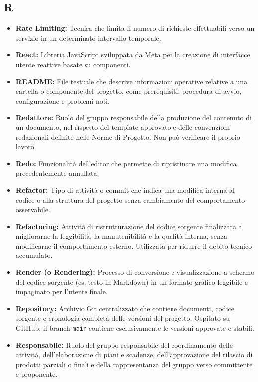 \subsection*{R}
\begin{itemize}[leftmargin=*]
      \item \textbf{Rate Limiting:} Tecnica che limita il numero di richieste effettuabili verso un servizio in un determinato intervallo temporale.
      \item \textbf{React:} Libreria JavaScript sviluppata da Meta per la creazione di interfacce utente reattive basate su componenti.
      \item \textbf{README:} File testuale che descrive informazioni operative relative
      a una cartella o componente del progetto, come prerequisiti, procedura di avvio,
      configurazione e problemi noti.
      \item \textbf{Redattore:} Ruolo del gruppo responsabile della produzione del
          contenuto di un documento, nel rispetto del template approvato e delle
          convenzioni redazionali definite nelle Norme di Progetto. Non può
          verificare il proprio lavoro.
      \item \textbf{Redo:} Funzionalità dell'editor che permette di ripristinare una modifica precedentemente annullata.      
      \item \textbf{Refactor:} Tipo di attività o commit che indica una modifica interna
      al codice o alla struttura del progetto senza cambiamento del comportamento
      osservabile.
      \item \textbf{Refactoring:} Attività di ristrutturazione del codice sorgente
      finalizzata a migliorarne la leggibilità, la manutenibilità e la qualità
      interna, senza modificarne il comportamento esterno. Utilizzata per ridurre
      il debito tecnico accumulato.
      \item \textbf{Render (o Rendering):} Processo di conversione e visualizzazione a schermo del codice sorgente (es. testo in Markdown) in un formato grafico leggibile e impaginato per l'utente finale.
      \item \textbf{Repository:} Archivio Git centralizzato che contiene documenti,
          codice sorgente e cronologia completa delle versioni del progetto.
          Ospitato su GitHub; il branch \texttt{main} contiene esclusivamente le
          versioni approvate e stabili.
      \item \textbf{Responsabile:} Ruolo del gruppo responsabile del coordinamento delle attività, dell'elaborazione di piani e scadenze, dell'approvazione del rilascio di prodotti parziali o finali e della rappresentanza del gruppo verso committente e proponente.

\end{itemize}
